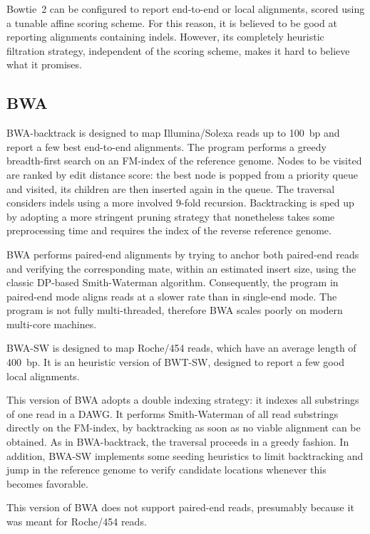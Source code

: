 Bowtie~2 can be configured to report end-to-end or local alignments, scored using a tunable affine scoring scheme.
For this reason, it is believed to be good at reporting alignments containing indels.
However, its completely heuristic filtration strategy, independent of the scoring scheme, makes it hard to believe what it promises.


\subsection{BWA}

BWA-backtrack \citep{BWA} is designed to map Illumina/Solexa reads up to 100~bp and report a few best end-to-end alignments.
The program performs a greedy breadth-first search on an FM-index of the reference genome.
Nodes to be visited are ranked by edit distance score: the best node is popped from a priority queue and visited, its children are then inserted again in the queue.
The traversal considers indels using a more involved 9-fold recursion.
Backtracking is sped up by adopting a more stringent pruning strategy that nonetheless takes some preprocessing time and requires the index of the reverse reference genome.

BWA performs paired-end alignments by trying to anchor both paired-end reads and verifying the corresponding mate, within an estimated insert size, using the classic DP-based Smith-Waterman algorithm.
Consequently, the program in paired-end mode aligns reads at a slower rate than in single-end mode.
The program is not fully multi-threaded, therefore BWA scales poorly on modern multi-core machines.

BWA-SW \citep{BWA-SW} is designed to map Roche/454 reads, which have an average length of 400~bp.
It is an heuristic version of BWT-SW, designed to report a few good local alignments.

This version of BWA adopts a double indexing strategy: it indexes all substrings of one read in a DAWG.
It performs Smith-Waterman of all read substrings directly on the FM-index, by backtracking as soon as no viable alignment can be obtained.
As in BWA-backtrack, the traversal proceeds in a greedy fashion.
In addition, BWA-SW implements some seeding heuristics to limit backtracking and jump in the reference genome to verify candidate locations whenever this becomes favorable.

This version of BWA does not support paired-end reads, presumably because it was meant for Roche/454 reads.

